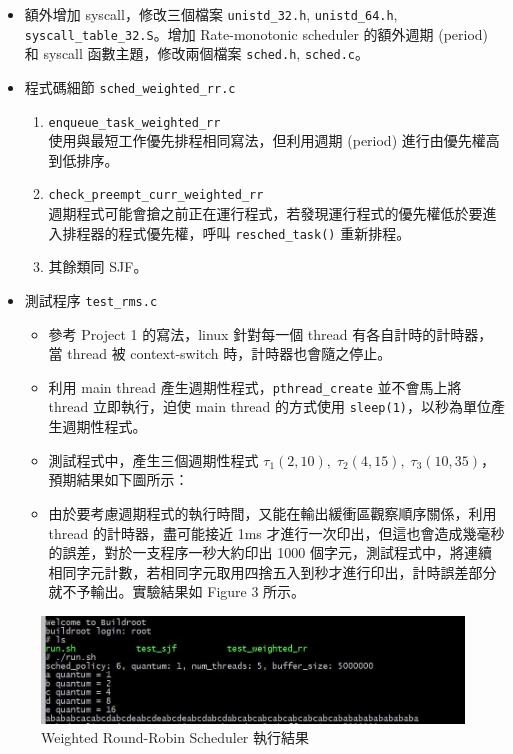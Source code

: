 \documentclass{res}
\begin{document}
\begin{resume}
\begin{itemize}
	\item 額外增加 syscall，修改三個檔案 \lstinline{unistd_32.h}, \lstinline{unistd_64.h}, \lstinline{syscall_table_32.S}。增加 Rate-monotonic scheduler 的額外週期 (period) 和 syscall 函數主題，修改兩個檔案 \lstinline{sched.h}, \lstinline{sched.c}。
	\item 程式碼細節 \lstinline{sched_weighted_rr.c}
		\begin{enumerate}
			\item \lstinline{enqueue_task_weighted_rr} \\
			使用與最短工作優先排程相同寫法，但利用週期 (period) 進行由優先權高到低排序。
			\item \lstinline{check_preempt_curr_weighted_rr} \\
			週期程式可能會搶之前正在運行程式，若發現運行程式的優先權低於要進入排程器的程式優先權，呼叫 \lstinline{resched_task()} 重新排程。
			\item 其餘類同 SJF。
		\end{enumerate}
	\item 測試程序 \lstinline{test_rms.c}
		\begin{itemize}
		\item 參考 Project 1 的寫法，linux 針對每一個 thread 有各自計時的計時器，當 thread 被 context-switch 時，計時器也會隨之停止。
		\item 利用 main thread 產生週期性程式，\lstinline{pthread_create} 並不會馬上將 thread 立即執行，迫使 main thread 的方式使用 \lstinline{sleep(1)}，以秒為單位產生週期性程式。
		\item 測試程式中，產生三個週期性程式 $\tau_{1}(2, 10), \; \tau_{2}(4, 15), \; \tau_{3}(10, 35)$，預期結果如下圖所示：
		\item 由於要考慮週期程式的執行時間，又能在輸出緩衝區觀察順序關係，利用 thread 的計時器，盡可能接近 1ms 才進行一次印出，但這也會造成幾毫秒的誤差，對於一支程序一秒大約印出 1000 個字元，測試程式中，將連續相同字元計數，若相同字元取用四捨五入到秒才進行印出，計時誤差部分就不予輸出。實驗結果如 Figure 3 所示。
		\end{itemize}
\end{itemize}



\vspace*{.1in} 

\begin{figure}[htp]
    \begin{center}
        \includegraphics[width=400pt]{images/exp-weighted-rr.jpg}
        \caption{Weighted Round-Robin Scheduler 執行結果}
        \label{fig: result}
    \end{center}
\end{figure}


\end{resume}
\end{document}
